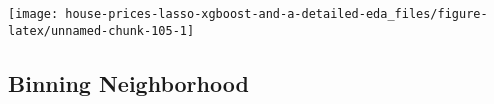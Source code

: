 \documentclass[]{article}
\newenvironment{Shaded}{\begin{snugshade}}{\end{snugshade}}
\newcommand{\KeywordTok}[1]{\textcolor[rgb]{0.13,0.29,0.53}{\textbf{#1}}}
\newcommand{\StringTok}[1]{\textcolor[rgb]{0.31,0.60,0.02}{#1}}
\newcommand{\CommentTok}[1]{\textcolor[rgb]{0.56,0.35,0.01}{\textit{#1}}}
\newcommand{\OperatorTok}[1]{\textcolor[rgb]{0.81,0.36,0.00}{\textbf{#1}}}
\newcommand{\NormalTok}[1]{#1}
\begin{document}
\texttt{[image: house-prices-lasso-xgboost-and-a-detailed-eda\_files/figure-latex/unnamed-chunk-105-1]}

\begin{Shaded}
\end{Shaded}

\subsection{Binning Neighborhood}\label{binning-neighborhood}
\end{document}
